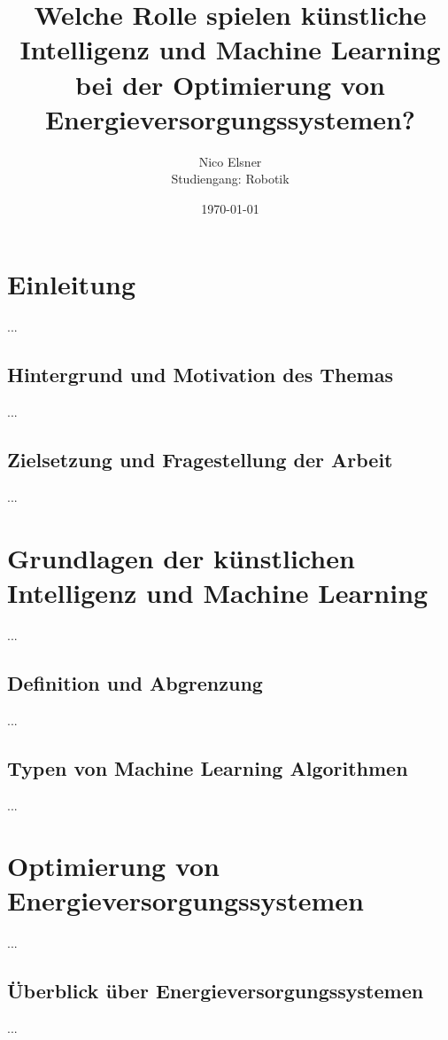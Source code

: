 \documentclass[
11pt, 
a4paper,
DIV = 14,
twoside,
twocolumn, %
parskip =half, %
headsepline, %
openright, %
]{scrreprt}
\begin{document}
	
	\title{Welche Rolle spielen künstliche Intelligenz und Machine Learning bei der Optimierung von Energieversorgungssystemen?}
	\author{Nico Elsner\\
		Studiengang: Robotik}
	\date{\today}
	\maketitle
	\tableofcontents
	\thispagestyle{empty}

	\chapter{Einleitung}
	\setcounter{page}{1}
	...
	\section{Hintergrund und Motivation des Themas}
	...
	\section{Zielsetzung und Fragestellung der Arbeit}
	...


	\chapter{Grundlagen der künstlichen Intelligenz und Machine Learning}
	...
	\section{Definition und Abgrenzung}
	...
	\section{Typen von Machine Learning Algorithmen}
	...


	\chapter{Optimierung von Energieversorgungssystemen}
	...
	\section{Überblick über Energieversorgungssystemen}
	...
\end{document}
